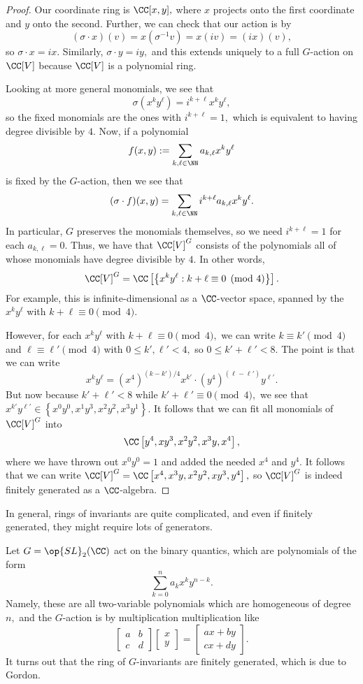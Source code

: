 \begin{proof}
	Our coordinate ring is $\CC[x,y],$ where $x$ projects onto the first coordinate and $y$ onto the second. Further, we can check that our action is by
	\[(\sigma\cdot x)(v)=x(\sigma^{-1}v)=x(iv)=(ix)(v),\]
	so $\sigma\cdot x=ix.$ Similarly, $\sigma\cdot y=iy,$ and this extends uniquely to a full $G$-action on $\CC[V]$ because $\CC[V]$ is a polynomial ring.
	
	Looking at more general monomials, we see that
	\[\sigma\left(x^ky^\ell\right)=i^{k+\ell}x^ky^\ell,\]
	so the fixed monomials are the ones with $i^{k+\ell}=1,$ which is equivalent to having degree divisible by $4.$ Now, if a polynomial
	\[f(x,y):=\sum_{k,\ell\in\NN}a_{k,\ell}x^ky^\ell\]
	is fixed by the $G$-action, then we see that
	\[(\sigma\cdot f)(x,y)=\sum_{k,\ell\in\NN}i^{k+\ell}a_{k,\ell}x^ky^\ell.\]
	In particular, $G$ preserves the monomials themselves, so we need $i^{k+\ell}=1$ for each $a_{k,\ell}=0.$ Thus, we have that $\CC[V]^G$ consists of the polynomials all of whose monomials have degree divisible by $4.$ In other words,
	\[\CC[V]^G=\CC\left[\left\{x^ky^\ell:k+\ell\equiv0\pmod4\right\}\right].\]
	For example, this is infinite-dimensional as a $\CC$-vector space, spanned by the $x^ky^\ell$ with $k+\ell\equiv0\pmod4.$
	
	However, for each $x^ky^\ell$ with $k+\ell\equiv0\pmod4,$ we can write $k\equiv k'\pmod4$ and $\ell\equiv\ell'\pmod4$ with $0\le k',\ell'<4,$ so $0\le k'+\ell'<8.$ The point is that we can write
	\[x^ky^\ell=\left(x^4\right)^{(k-k')/4}x^{k'}\cdot\left(y^4\right)^{(\ell-\ell')}y^{\ell'}.\]
	But now because $k'+\ell'<8$ while $k'+\ell'\equiv0\pmod4,$ we see that $x^{k'}y^{\ell'}\in\left\{x^0y^0,x^1y^3,x^2y^2,x^3y^1\right\}.$ It follows that we can fit all monomials of $\CC[V]^G$ into
	\[\CC\left[y^4,xy^3,x^2y^2,x^3y,x^4\right],\]
	where we have thrown out $x^0y^0=1$ and added the needed $x^4$ and $y^4.$ It follows that we can write $\CC[V]^G=\CC\left[x^4,x^3y,x^2y^2,xy^3,y^4\right],$ so $\CC[V]^G$ is indeed finitely generated as a $\CC$-algebra.
\end{proof}
In general, rings of invariants are quite complicated, and even if finitely generated, they might require lots of generators.
\begin{ex}
	Let $G=\op{SL}_2(\CC)$ act on the binary quantics, which are polynomials of the form
	\[\sum_{k=0}^na_kx^ky^{n-k}.\]
	Namely, these are all two-variable polynomials which are homogeneous of degree $n,$ and the $G$-action is by multiplication multiplication like
	\[\begin{bmatrix}
		a & b \\
		c & d
	\end{bmatrix}\begin{bmatrix}
		x \\ y
	\end{bmatrix}=\begin{bmatrix}
		ax+by \\
		cx+dy
	\end{bmatrix}.\]
	It turns out that the ring of $G$-invariants are finitely generated, which is due to Gordon.
\end{ex}

